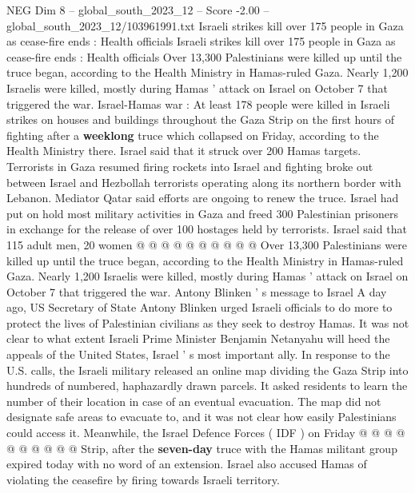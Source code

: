 \begin{textsample}{NEG Dim 8 – global\_south\_2023\_12 – Score -2.00 – global\_south\_2023\_12/103961991.txt}  \label{ex:f8_neg_012}
Israeli strikes kill over 175 people in Gaza as cease-fire ends : Health officials Israeli strikes kill over 175 people in Gaza as cease-fire ends : Health officials Over 13,300 Palestinians were killed up until the truce began, according to the Health Ministry in Hamas-ruled Gaza.
Nearly 1,200 Israelis were killed, mostly during Hamas ' attack on Israel on October 7 that triggered the war.
Israel-Hamas war : At least 178 people were killed in Israeli strikes on houses and buildings throughout the Gaza Strip on the first hours of fighting after a \textbf{weeklong} truce which collapsed on Friday, according to the Health Ministry there.
Israel said that it struck over 200 Hamas targets.
Terrorists in Gaza resumed firing rockets into Israel and fighting broke out between Israel and Hezbollah terrorists operating along its northern border with Lebanon.
Mediator Qatar said efforts are ongoing to renew the truce.
Israel had put on hold most military activities in Gaza and freed 300 Palestinian prisoners in exchange for the release of over 100 hostages held by terrorists.
Israel said that 115 adult men, 20 women @ @ @ @ @ @ @ @ @ @ Over 13,300 Palestinians were killed up until the truce began, according to the Health Ministry in Hamas-ruled Gaza.
Nearly 1,200 Israelis were killed, mostly during Hamas ' attack on Israel on October 7 that triggered the war.
Antony Blinken ' s message to Israel A day ago, US Secretary of State Antony Blinken urged Israeli officials to do more to protect the lives of Palestinian civilians as they seek to destroy Hamas.
It was not clear to what extent Israeli Prime Minister Benjamin Netanyahu will heed the appeals of the United States, Israel ' s most important ally.
In response to the U.S. calls, the Israeli military released an online map dividing the Gaza Strip into hundreds of numbered, haphazardly drawn parcels.
It asked residents to learn the number of their location in case of an eventual evacuation.
The map did not designate safe areas to evacuate to, and it was not clear how easily Palestinians could access it.
Meanwhile, the Israel Defence Forces ( IDF ) on Friday @ @ @ @ @ @ @ @ @ @ Strip, after the \textbf{seven-day} truce with the Hamas militant group expired today with no word of an extension.
Israel also accused Hamas of violating the ceasefire by firing towards Israeli territory.

\end{textsample}
